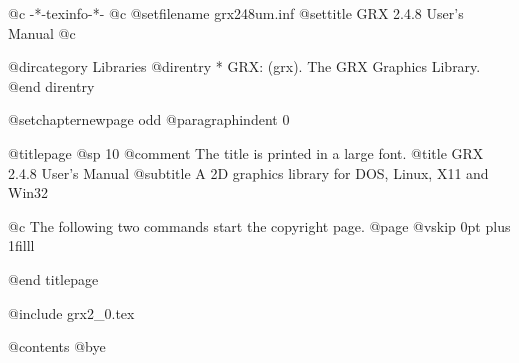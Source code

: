    @c -*-texinfo-*-
@c %
@setfilename grx248um.inf
@settitle GRX 2.4.8 User's Manual
@c %

@dircategory Libraries
@direntry
* GRX: (grx).                   The GRX Graphics Library.
@end direntry

@setchapternewpage odd
@paragraphindent 0

@titlepage
@sp 10
@comment The title is printed in a large font.
@title GRX 2.4.8 User's Manual
@subtitle A 2D graphics library for DOS, Linux, X11 and Win32

@c The following two commands start the copyright page.
@page
@vskip 0pt plus 1filll

@end titlepage

@include grx2_0.tex

@contents
@bye

